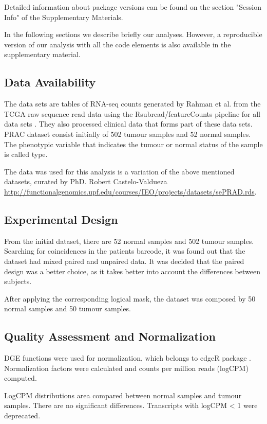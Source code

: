 \documentclass[9pt,twocolumn,twoside]{gsajnl}
\begin{document}
Detailed information about package versions can be found on the section "Session Info" of the Supplementary Materials.

In the following sections we describe briefly our analyses. However, a reproducible version of our analysis with all the code elements is also available in the supplementary material.

\subsection*{Data Availability}

The data sets are tables of RNA-seq counts generated by Rahman et al. \cite{Rahman15112015} from the TCGA raw sequence read data using the Rsubread/featureCounts pipeline for all data sets \cite{Rsubread}. They also processed clinical data that forms part of these data sets. PRAC dataset consist initially of 502 tumour samples and 52 normal samples. The phenotypic variable that indicates the tumour or normal status of the sample is called type.

The data was used for this analysis is a variation of the above mentioned datasets, curated by PhD. Robert Castelo-Valdueza \url{http://functionalgenomics.upf.edu/courses/IEO/projects/datasets/sePRAD.rds}.

\subsection*{Experimental Design}

From the initial dataset, there are 52 normal samples and 502 tumour samples. Searching for coincidences in the patients barcode, it was found out that the dataset had mixed paired and unpaired data. It was decided that the paired design was a better choice, as it takes better into account the differences between subjects.

After applying the corresponding logical mask, the dataset was composed by 50 normal samples and 50 tumour samples.

\subsection*{Quality Assessment and Normalization}

DGE functions were used for normalization, which belongs to edgeR package \cite{Robinson01012010}. Normalization factors were calculated and counts per million reads (logCPM) computed.

LogCPM distributions area compared between normal samples and tumour samples. There are no significant differences. Transcripts with logCPM < 1 were deprecated.
\end{document}
